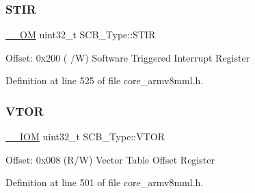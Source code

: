 \subsubsection{\texorpdfstring{S\+T\+IR}{STIR}}
{\footnotesize\ttfamily \hyperlink{core__sc300_8h_a0ea2009ed8fd9ef35b48708280fdb758}{\+\_\+\+\_\+\+OM} uint32\+\_\+t S\+C\+B\+\_\+\+Type\+::\+S\+T\+IR}

Offset\+: 0x200 ( /W) Software Triggered Interrupt Register 

Definition at line 525 of file core\+\_\+armv8mml.\+h.

\mbox{\label{struct_s_c_b___type_a187a4578e920544ed967f98020fb8170}} 
\subsubsection{\texorpdfstring{V\+T\+OR}{VTOR}}
{\footnotesize\ttfamily \hyperlink{core__sc300_8h_ab6caba5853a60a17e8e04499b52bf691}{\+\_\+\+\_\+\+I\+OM} uint32\+\_\+t S\+C\+B\+\_\+\+Type\+::\+V\+T\+OR}

Offset\+: 0x008 (R/W) Vector Table Offset Register 

Definition at line 501 of file core\+\_\+armv8mml.\+h.



